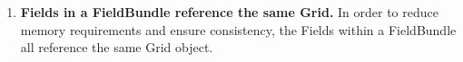 

\begin{enumerate}

\item{\bf Fields in a FieldBundle reference the same Grid.}
In order to reduce memory requirements and ensure consistency, the 
Fields within a FieldBundle all reference the same Grid object.

\end{enumerate}


